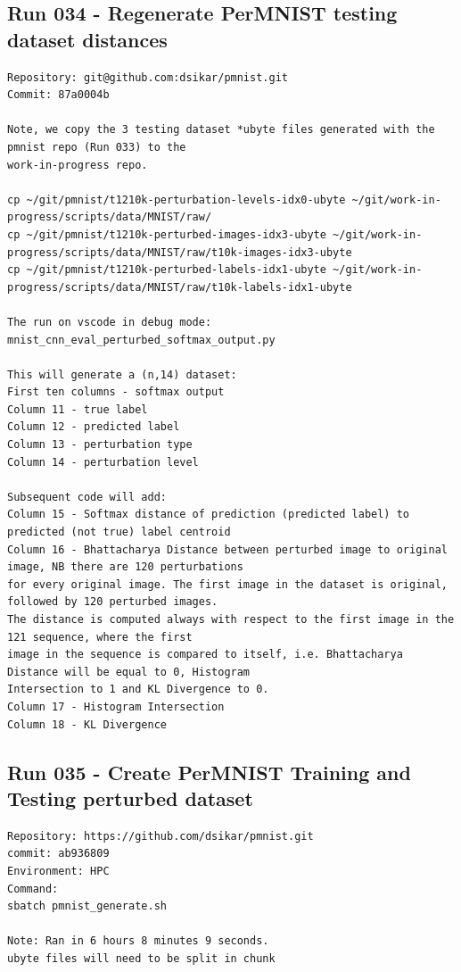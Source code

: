 \subsection{Run 034 - Regenerate PerMNIST testing dataset distances}
\label{app_res:034}
\begin{verbatim}
Repository: git@github.com:dsikar/pmnist.git
Commit: 87a0004b

Note, we copy the 3 testing dataset *ubyte files generated with the pmnist repo (Run 033) to the 
work-in-progress repo.

cp ~/git/pmnist/t1210k-perturbation-levels-idx0-ubyte ~/git/work-in-progress/scripts/data/MNIST/raw/
cp ~/git/pmnist/t1210k-perturbed-images-idx3-ubyte ~/git/work-in-progress/scripts/data/MNIST/raw/t10k-images-idx3-ubyte
cp ~/git/pmnist/t1210k-perturbed-labels-idx1-ubyte ~/git/work-in-progress/scripts/data/MNIST/raw/t10k-labels-idx1-ubyte

The run on vscode in debug mode:
mnist_cnn_eval_perturbed_softmax_output.py

This will generate a (n,14) dataset:
First ten columns - softmax output
Column 11 - true label
Column 12 - predicted label
Column 13 - perturbation type
Column 14 - perturbation level

Subsequent code will add:
Column 15 - Softmax distance of prediction (predicted label) to predicted (not true) label centroid
Column 16 - Bhattacharya Distance between perturbed image to original image, NB there are 120 perturbations
for every original image. The first image in the dataset is original, followed by 120 perturbed images. 
The distance is computed always with respect to the first image in the 121 sequence, where the first
image in the sequence is compared to itself, i.e. Bhattacharya Distance will be equal to 0, Histogram
Intersection to 1 and KL Divergence to 0.
Column 17 - Histogram Intersection
Column 18 - KL Divergence

\end{verbatim}

\subsection{Run 035 - Create PerMNIST Training and Testing perturbed dataset}
\label{app_res:035}
\begin{verbatim}
Repository: https://github.com/dsikar/pmnist.git
commit: ab936809
Environment: HPC
Command:
sbatch pmnist_generate.sh

Note: Ran in 6 hours 8 minutes 9 seconds.
ubyte files will need to be split in chunk
\end{verbatim}


